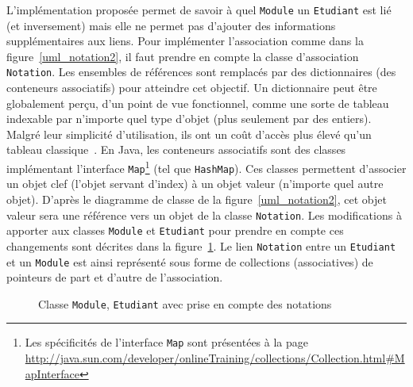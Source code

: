 \documentclass[a4paper,11pt]{article}
\begin{document}
L'implémentation proposée permet de savoir à quel \texttt{Module} un \texttt{Etudiant} est lié (et inversement)
mais elle ne permet pas d'ajouter des informations supplémentaires aux liens. Pour implémenter l'association 
comme dans la figure~\ref{uml_notation2}, il faut prendre en compte la classe d'association \texttt{Notation}. 
Les ensembles de références sont remplacés par des dictionnaires (des conteneurs associatifs) pour atteindre cet objectif. 
Un dictionnaire peut être globalement perçu, d'un point de vue fonctionnel, comme une sorte de tableau 
indexable par n'importe quel type d'objet (plus seulement par des entiers). Malgré leur simplicité d'utilisation, ils ont 
un coût d'accès plus élevé qu'un tableau classique~\citep{book/Sedgewick1998}. En Java, les conteneurs associatifs 
sont des classes implémentant l'interface \texttt{Map}\footnote{Les spécificités de l'interface \texttt{Map} 
sont présentées à la page \url{http://java.sun.com/developer/onlineTraining/collections/Collection.html\#MapInterface}} 
(tel que \texttt{HashMap}). Ces classes permettent d'associer un objet clef (l'objet servant d'index) 
à un objet valeur (n'importe quel autre objet). D'après le diagramme de classe de la figure~\ref{uml_notation2}, cet 
objet valeur sera une référence vers un objet de la classe \texttt{Notation}. 
Les modifications à apporter aux classes \texttt{Module} et \texttt{Etudiant} pour prendre en compte ces changements sont décrites 
dans la figure~\ref{classe_notation_map}. Le lien \texttt{Notation} entre un \texttt{Etudiant} et un \texttt{Module} 
est ainsi représenté sous forme de collections (associatives) de pointeurs de part et d'autre de l'association.

\begin{figure}\centering\footnotesize
{}
\caption{Classe \texttt{Module}, \texttt{Etudiant} avec prise en compte des notations\label{classe_notation_map}}
\end{figure}
\end{document}
